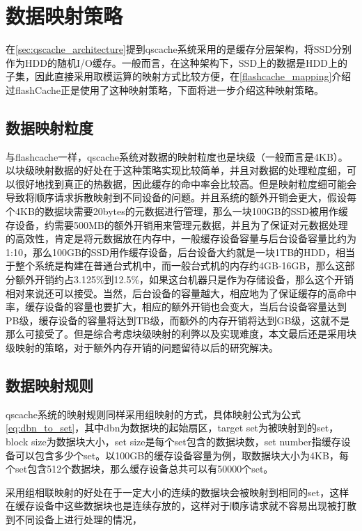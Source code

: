 \section{数据映射策略}
在\ref{sec:qscache_architecture}提到qscache系统采用的是缓存分层架构，将SSD分别作为HDD的随机I/O缓存。一般而言，在这种架构下，SSD上的数据是HDD上的子集，因此直接采用取模运算的映射方式比较方便，在\ref{flashcache_mapping}介绍过flashCache正是使用了这种映射策略，下面将进一步介绍这种映射策略。 

\subsection{数据映射粒度}

与flashcache一样，qscache系统对数据的映射粒度也是块级（一般而言是4KB）。以块级映射数据的好处在于这种策略实现比较简单，并且对数据的处理粒度细，可以很好地找到真正的热数据，因此缓存的命中率会比较高。但是映射粒度细可能会导致将顺序请求拆散映射到不同设备的问题。并且系统的额外开销会更大，假设每个4KB的数据块需要20bytes的元数据进行管理，那么一块100GB的SSD被用作缓存设备，约需要500MB的额外开销用来管理元数据，并且为了保证对元数据处理的高效性，肯定是将元数据放在内存中，一般缓存设备容量与后台设备容量比约为1:10，那么100GB的SSD用作缓存设备，后台设备大约就是一块1TB的HDD，相当于整个系统是构建在普通台式机中，而一般台式机的内存约4GB-16GB，那么这部分额外开销约占3.125\%到12.5\%，如果这台机器只是作为存储设备，那么这个开销相对来说还可以接受。当然，后台设备的容量越大，相应地为了保证缓存的高命中率，缓存设备的容量也要扩大，相应的额外开销也会变大，当后台设备容量达到PB级，缓存设备的容量将达到TB级，而额外的内存开销将达到GB级，这就不是那么可接受了。但是综合考虑块级映射的利弊以及实现难度，本文最后还是采用块级映射的策略，对于额外内存开销的问题留待以后的研究解决。

\subsection{数据映射规则}

qscache系统的映射规则同样采用组映射的方式，具体映射公式为公式\ref{eq:dbn_to_set}，其中dbn为数据块的起始扇区，target set为被映射到的set，block size为数据块大小，set size是每个set包含的数据块数，set number指缓存设备可以包含多少个set。以100GB的缓存设备容量为例，取数据块大小为4KB，每个set包含512个数据块，那么缓存设备总共可以有50000个set。

采用组相联映射的好处在于一定大小的连续的数据块会被映射到相同的set，这样在缓存设备中这些数据块也是连续存放的，这样对于顺序请求就不容易出现被打散到不同设备上进行处理的情况，


